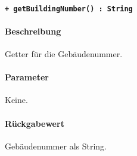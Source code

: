 \paragraph{\texttt{+ getBuildingNumber() : String}}\label{AP_Alias_getBuildingNumber}%
\paragraph*{Beschreibung}
Getter für die Gebäudenummer.
\paragraph*{Parameter}
Keine.
\paragraph*{Rückgabewert}
Gebäudenummer als String.
